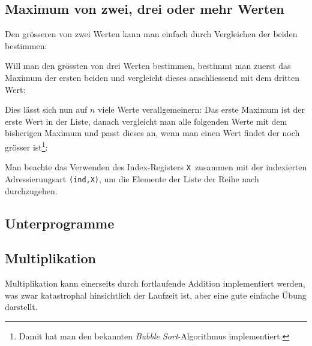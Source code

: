 \documentclass[11pt]{scrartcl}
\newcommand{\xreg}{\texttt{X}}
\newcommand{\indx}{\texttt{(ind,X)}}
\begin{document}
\subsection{Maximum von zwei, drei oder mehr Werten}
\label{sec:example_max}

Den grösseren von zwei Werten kann man einfach durch Vergleichen der
beiden bestimmen:

 
Will man den grössten von drei Werten bestimmen, bestimmt man zuerst das Maximum der ersten beiden und vergleicht dieses anschliessend mit dem dritten Wert:


Dies lässt sich nun auf $n$ viele Werte verallgemeinern: Das erste
Maximum ist der erste Wert in der Liste, danach vergleicht man alle
folgenden Werte mit dem bisherigen Maximum und passt dieses an, wenn
man einen Wert findet der noch grösser ist\footnote{Damit hat
  man den bekannten \emph{Bubble Sort}-Algorithmus implementiert.}:


Man beachte das Verwenden des Index-Registers \xreg\ zusammen mit der
indexierten Adressierungsart \indx, um die Elemente der Liste der
Reihe nach durchzugehen.


\subsection{Unterprogramme}
\label{sec:example_2byte_add_sub}






\subsection{Multiplikation}
\label{sec:example_mult}

Multiplikation kann einerseits durch fortlaufende Addition
implementiert werden, was zwar katastrophal hinsichtlich der Laufzeit
ist, aber eine gute einfache Übung darstellt.
\end{document}
